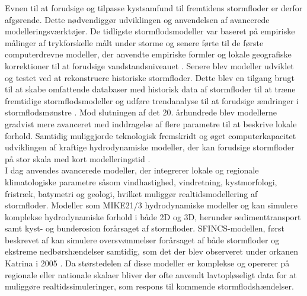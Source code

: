 Evnen til at forudsige og tilpasse kystsamfund til fremtidens stormfloder er derfor afgørende. Dette nødvendiggør udviklingen og anvendelsen af avancerede modelleringsværktøjer. De tidligste stormflodsmodeller var baseret på empiriske målinger af trykforskelle målt under storme og senere førte til de første computerdrevne modeller, der anvendte empiriske formler og lokale geografiske korrektioner til at forudsige vandstandsniveauet \citep{massey_history_2007}. Senere blev modeller udviklet og testet ved at rekonstruere historiske stormfloder. Dette blev en tilgang brugt til at skabe omfattende databaser med historisk data af stormfloder til at træne fremtidige stormflodsmodeller og udføre trendanalyse til at forudsige ændringer i stormflodsmønstre \citep{tadesse_database_2021, dang_dataset_2024}. Mod slutningen af det 20. århundrede blev modellerne gradvist mere avanceret med inddragelse af flere parametre til at beskrive lokale forhold. Samtidig muliggjorde teknologisk fremskridt og øget computerkapacitet udviklingen af kraftige hydrodynamiske modeller, der kan forudsige stormfloder på stor skala med kort modelleringstid \citep{tadesse_database_2021, massey_history_2007}.\\
I dag anvendes avancerede modeller, der integrerer lokale og regionale klimatologiske parametre såsom vindhastighed, vindretning, kystmorfologi, fristræk, batymetri og geologi, hvilket muliggør realtidsmodellering af stormfloder. Modeller som MIKE21/3 hydrodynamiske modeller \citep{dhi_mike_2024} og \cite{adcirc_introduction_nodate} kan simulere komplekse hydrodynamiske forhold i både 2D og 3D, herunder sedimenttransport samt kyst- og bunderosion forårsaget af stormfloder. SFINCS-modellen, først beskrevet af \cite{leijnse_modeling_2021} kan simulere oversvømmelser forårsaget af både stormfloder og ekstreme nedbørshændelser samtidig, som det der blev observeret under orkanen Katrina i 2005 \citep{reible_hurricane_2007}. Da størstedelen af disse modeller er komplekse og opererer på regionale eller nationale skalaer bliver der ofte anvendt lavtopløseligt data for at muliggøre realtidssimuleringer, som respons til kommende stormflodshændelser.\\

